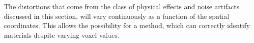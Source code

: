 The distortions that come from the class of physical effects and noise
artifacts discussed in this section, will vary continuously as a function of
the spatial coordinates. This allows the possibility for a method, which can
correctly identify materials despite varying voxel values.



